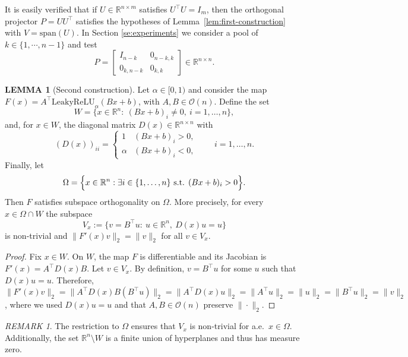 \documentclass{article}
\theoremstyle{plain}
\theoremstyle{definition}
\theoremstyle{definition}
\newtheorem{lemma}[theorem]{LEMMA}
\theoremstyle{remark}
\newtheorem{remark}[theorem]{REMARK}
\theoremstyle{definition}
\theoremstyle{definition}
\theoremstyle{remark}
\numberwithin{equation}{section}
\begin{document}
It is easily verified that if $U\in\mathbb{R}^{n\times m}$ satisfies $U^\top U=I_m$, then the orthogonal projector $P=UU^\top$ satisfies the hypotheses of Lemma~\ref{lem:first-construction} with $V=\mathrm{span}(U)$. In Section \ref{se:experiments} we consider a pool of $k\in \{1,\cdots,n-1\}$ and test
\begin{equation}\label{eq:projection}
P = \begin{bmatrix} I_{n-k} & 0_{n-k,k} \\ 0_{k,n-k} & 0_{k,k} \end{bmatrix}\in\mathbb{R}^{n\times n}.
\end{equation}

\begin{lemma}[Second construction]\label{lem:second-construction}
Let $\alpha\in[0,1)$ and consider the map $F(x)=A^\top \mathrm{LeakyReLU}_{\alpha}(Bx+b)$, with $A,B\in\mathcal{O}(n)$. Define the set
\[
W=\{x\in\mathbb{R}^n:\ (Bx+b)_i\neq 0,\ i=1,\dots,n\},
\]
and, for $x\in W$, the diagonal matrix $D(x)\in\mathbb{R}^{n\times n}$ with
\[
(D(x))_{ii}=\begin{cases}
1 & (Bx+b)_i>0,\\
\alpha & (Bx+b)_i<0,
\end{cases}
\qquad i=1,\dots,n.
\]
Finally, let
\[
\Omega=\Bigl\{x\in\mathbb{R}^n: \exists i\in\{1,\dots,n\}\ \text{s.t. }(Bx+b)_i>0\Bigr\}.
\]
Then $F$ satisfies subspace orthogonality on $\Omega$. More precisely, for every $x\in \Omega\cap W$ the subspace
\[
V_x:=\{v=B^\top u:\ u\in\mathbb{R}^n,\ D(x)u=u\}
\]
is non-trivial and $\|F'(x)v\|_2=\|v\|_2$ for all $v\in V_x$.
\end{lemma}

\begin{proof}
Fix $x\in W$. On $W$, the map $F$ is differentiable and its Jacobian is $F'(x)=A^\top D(x)B$. Let $v\in V_x$. By definition, $v=B^\top u$ for some $u$ such that $D(x)u=u$. Therefore, $\|F'(x)v\|_2=\|A^\top D(x)B(B^\top u)\|_2=\|A^\top D(x)u\|_2 =\|A^\top u\|_2=\|u\|_2=\|B^\top u\|_2=\|v\|_2$, where we used $D(x)u=u$ and that $A,B\in\mathcal{O}(n)$ preserve $\|\cdot\|_2$.
\end{proof}

\begin{remark} The restriction to $\Omega$ ensures that $V_x$ is non-trivial for a.e.\, $x\in\Omega$. Additionally, the set $\mathbb{R}^n\setminus W$ is a finite union of hyperplanes and thus has measure zero.
\end{remark}
\end{document}
